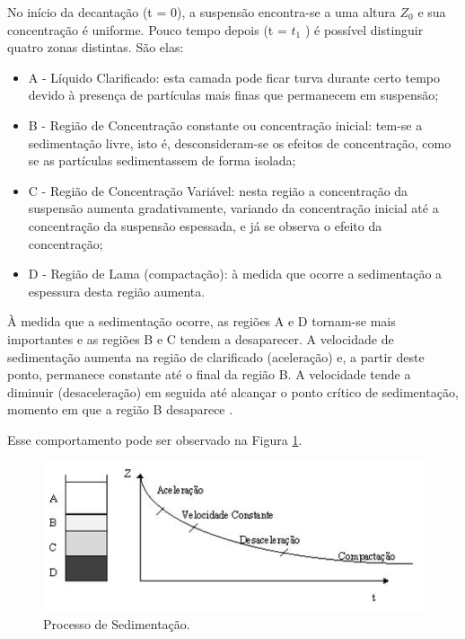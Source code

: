 No início da decantação (t = 0), a suspensão encontra-se a uma altura $ Z_{0} $ e sua concentração é uniforme. Pouco tempo depois (t = $ t_{1} $ ) é possível distinguir quatro zonas distintas. São elas:


\begin{itemize}
\item A - Líquido Clarificado: esta camada pode ficar turva durante certo tempo devido à presença de partículas mais finas que permanecem em suspensão;
\item B - Região de Concentração constante ou concentração inicial: tem-se a sedimentação livre, isto é, desconsideram-se os efeitos de concentração, como se as partículas sedimentassem de forma isolada;
\item C - Região de Concentração Variável: nesta região a concentração da suspensão aumenta gradativamente, variando da concentração inicial até a concentração da suspensão espessada, e já se observa o efeito da concentração;
\item D - Região de Lama (compactação): à medida que ocorre a sedimentação a espessura desta região aumenta.  
\end{itemize}

À medida que a sedimentação ocorre, as regiões A e D tornam-se mais importantes e as regiões B e C tendem a desaparecer. 
A velocidade de sedimentação aumenta na região de clarificado (aceleração) e, a partir deste ponto, permanece constante até o final da região B. A velocidade tende a diminuir (desaceleração) em seguida até alcançar o ponto crítico de sedimentação, momento em que a região B desaparece \citep{macabe}.

Esse comportamento pode ser observado na Figura \ref{sedimentaP}.


\begin{figure}[H]
	\begin{center}
		\includegraphics[scale=.8,trim={0 0 0 0}]{figuras/ladeq/sedi/graphProv}
		\caption{Processo de Sedimentação.}
		\label{sedimentaP}
	\end{center}
\end{figure}

